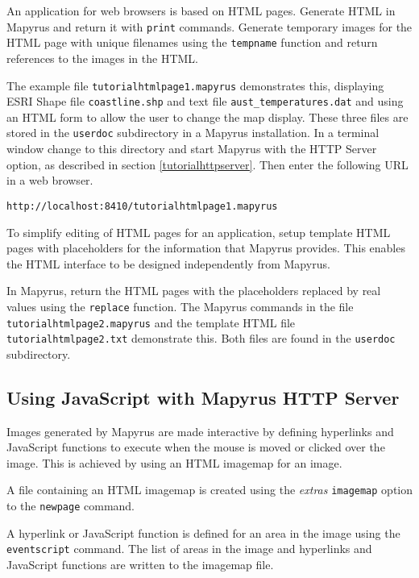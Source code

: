 An application for web browsers is based on HTML pages.
Generate HTML in Mapyrus and return it with \texttt{print} commands.
Generate temporary images for the HTML page with
unique filenames using the
\texttt{tempname}
function and return references to the images in the HTML.

The example file \texttt{tutorialhtmlpage1.mapyrus} demonstrates
this, displaying ESRI Shape file
\texttt{coastline.shp}
and text file
\texttt{aust\_temperatures.dat}
and using an HTML form to allow
the user to change the map display.
These three files are stored in the \texttt{userdoc} subdirectory
in a Mapyrus installation.
In a terminal window change to this directory and
start Mapyrus with the HTTP Server option, as described in section
\ref{tutorialhttpserver}.
Then enter the following URL in a web browser.

\begin{verbatim}
http://localhost:8410/tutorialhtmlpage1.mapyrus
\end{verbatim}

To simplify editing of HTML pages for an application, setup
template HTML pages with placeholders for the information that
Mapyrus provides.  This enables the HTML interface to be designed
independently from Mapyrus.

In Mapyrus, return the HTML pages with the placeholders
replaced by real values using the
\texttt{replace}
function.  The Mapyrus commands in the file \texttt{tutorialhtmlpage2.mapyrus}
and the template HTML file \texttt{tutorialhtmlpage2.txt}
demonstrate this.  Both files are found in the
\texttt{userdoc} subdirectory.

\subsection{Using JavaScript with Mapyrus HTTP Server}
\label{tutorialjavascript}

Images generated by Mapyrus are made interactive by defining hyperlinks and
JavaScript functions to execute when the mouse is moved or clicked over the
image.  This is achieved by using an HTML imagemap for an image.

A file containing an HTML imagemap is created using the \textit{extras}
\texttt{imagemap} option to the \texttt{newpage} command.

A hyperlink or JavaScript function is defined for an area in the image using
the \texttt{eventscript} command.  The list of areas in the image and
hyperlinks and JavaScript functions are written to the imagemap file.

